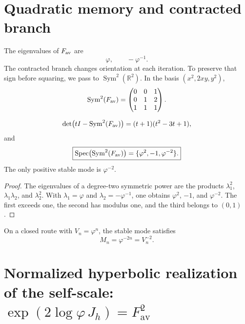 \section{Quadratic memory and contracted branch}

The eigenvalues of \(F_{\rm av}\) are
\[
 \varphi,
 \qquad
 -\varphi^{-1}.
\]
The contracted branch changes orientation at each iteration. To preserve
that sign before squaring, we pass to
\(\operatorname{Sym}^2(\mathbb R^2)\). In the basis
\((x^2,2xy,y^2)\),
\begin{equation}
 \operatorname{Sym}^2(F_{\rm av})=
 \begin{pmatrix}
 0&0&1\\
 0&1&2\\
 1&1&1
 \end{pmatrix}.
 \label{gfp:b:eq:sym2-Fav-phi}
\end{equation}

\begin{theorem}
\label{gfp:b:thm:espectro-sym2-phi}
\[
 \det\bigl(tI-\operatorname{Sym}^2(F_{\rm av})\bigr)
 =(t+1)(t^2-3t+1),
\]
and
\begin{equation}
 \boxed{
 \operatorname{Spec}\bigl(\operatorname{Sym}^2(F_{\rm av})\bigr)
 =\{\varphi^2,-1,\varphi^{-2}\}.}
 \label{gfp:b:eq:espectro-sym2-phi}
\end{equation}
The only positive stable mode is \(\varphi^{-2}\).
\end{theorem}

\begin{proof}
The eigenvalues of a degree-two symmetric power are the products
\(\lambda_1^2\), \(\lambda_1\lambda_2\), and \(\lambda_2^2\). With
\(\lambda_1=\varphi\) and \(\lambda_2=-\varphi^{-1}\), one obtains
\(\varphi^2\), \(-1\), and \(\varphi^{-2}\). The first exceeds one, the
second has modulus one, and the third belongs to \((0,1)\).
\end{proof}

On a closed route with \(V_n=\varphi^n\), the stable mode satisfies
\begin{equation}
 \boxed{M_n=\varphi^{-2n}=V_n^{-2}.}
 \label{gfp:b:eq:modo-estable-phi}
\end{equation}

\section{Normalized hyperbolic realization of the self-scale: \(\exp(2\log\varphi\,J_h)=F_{\mathrm{av}}^2\)}

